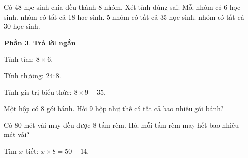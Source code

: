 \begin{ex} %
Có 48 học sinh chia đều thành 8 nhóm. Xét tính đúng sai:
\choiceTF
{\True Mỗi nhóm có 6 học sinh.}
{ nhóm có tất cả 18 học sinh.}
{5 nhóm có tất cả 35 học sinh.}
{ nhóm có tất cả 30 học sinh.}
\end{ex}

\textbf{Phần 3. Trả lời ngắn}

\begin{ex} %
Tính tích: $8 \times 6$.
\end{ex}

\begin{ex} %
Tính thương: $24 : 8$.
\end{ex}

\begin{ex} %
Tính giá trị biểu thức: $8 \times 9 - 35$.
\end{ex}

\begin{ex} %
Một hộp có 8 gói bánh. Hỏi 9 hộp như thế có tất cả bao nhiêu gói bánh?
\end{ex}

\begin{ex} %
Có 80 mét vải may đều được 8 tấm rèm. Hỏi mỗi tấm rèm may hết bao nhiêu mét vải?
\end{ex}

\begin{ex} %
Tìm $x$ biết: $x \times 8 = 50 + 14$.
\end{ex}
